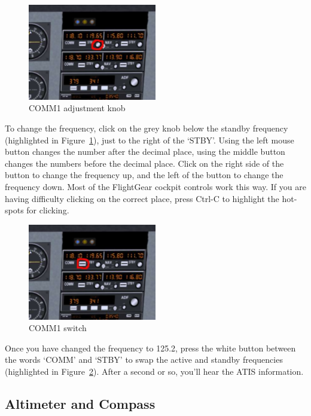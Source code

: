 \begin{figure}[!htp]
\centering
\includegraphics[width=0.5\textwidth]{comm1_knob}
\caption{COMM1 adjustment knob\label{comm1knob}}
\end{figure}

To change the frequency, click on the grey knob below the standby frequency
(highlighted in Figure~\ref{comm1knob}), just to the right of the `STBY'.
Using the left mouse button changes the number after the decimal place,
using the middle button changes the numbers before the decimal place.
Click on the right side of the button to change the frequency up, and
the left of the button to change the frequency down. Most of the FlightGear
cockpit controls work this way. If you are having difficulty clicking on the
correct place, press Ctrl-C to highlight the hot-spots for clicking.

\begin{figure}[!htp]
\centering
\includegraphics[width=0.5\textwidth]{comm1_switch}
\caption{COMM1 switch\label{comm1switch}}
\end{figure}

Once you have changed the frequency to 125.2, press the white button between
the words `COMM' and `STBY' to swap the active and standby frequencies
(highlighted in Figure~\ref{comm1switch}). After a second or so, you'll hear the ATIS information.

\subsection{Altimeter and Compass}

